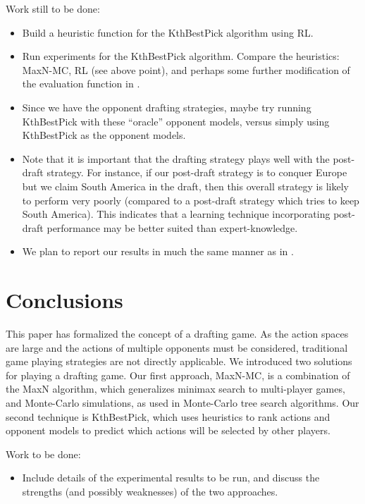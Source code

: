 \documentclass[letterpaper]{article}
\numberwithin{equation}{section}
\numberwithin{theorem}{section}
\numberwithin{lemma}{section}
\numberwithin{df}{section}
\begin{document}
Work still to be done:
\begin{itemize}
	\item Build a heuristic function for the KthBestPick algorithm using RL.
	\item Run experiments for the KthBestPick algorithm.  Compare the heuristics: MaxN-MC, RL (see above point), and perhaps some further modification of the evaluation function in \cite{RiskBots}.
	\item Since we have the opponent drafting strategies, maybe try running KthBestPick with these ``oracle'' opponent models, versus simply using KthBestPick as the opponent models.
	\item Note that it is important that the drafting strategy plays well with the post-draft strategy.  For instance, if our post-draft strategy is to conquer Europe but we claim South America in the draft, then this overall strategy is likely to perform very poorly (compared to a post-draft strategy which tries to keep South America).  This indicates that a learning technique incorporating post-draft performance may be better suited than expert-knowledge.
	\item We plan to report our results in much the same manner as in \cite{ZuckFelnerKraus2009}.
\end{itemize} 


\section{Conclusions}


This paper has formalized the concept of a drafting game.  As the action spaces are large and the actions of multiple opponents must be considered, traditional game playing strategies are not directly applicable.  We introduced two solutions for playing a drafting game.  Our first approach, MaxN-MC, is a combination of the MaxN algorithm, which generalizes minimax search to multi-player games, and Monte-Carlo simulations, as used in Monte-Carlo tree search algorithms.  Our second technique is KthBestPick, which uses heuristics to rank actions and opponent models to predict which actions will be selected by other players.  

Work to be done:
\begin{itemize}
	\item Include details of the experimental results to be run, and discuss the strengths (and possibly weaknesses) of the two approaches.
\end{itemize}
\end{document}

